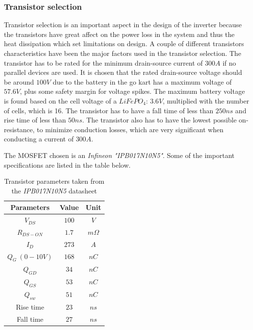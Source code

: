\subsubsection{Transistor selection}
Transistor selection is an important aspect in the design of the inverter because the transistors have great affect on the power loss in the system and thus the heat dissipation which set limitations on design. 
A couple of different transistors characteristics have been the major factors used in the transistor selection.
The transistor has to be rated for the minimum drain-source current of $300 A$ if no parallel devices are used. It is chosen that the rated drain-source voltage should be around $100 V$ due to the battery in the go kart has a maximum voltage of $57.6V$, plus some safety margin for voltage spikes. 
The maximum battery voltage is found based on the cell voltage of a $LiFePO_4$: $3.6 V$, multiplied with the number of cells, which is 16. The transistor has to have a fall time of less than $250ns$ and rise time of less than $50ns$. The transistor also has to have the lowest possible on-resistance, to minimize conduction losses, which are very significant when conducting a current of $300A$.


The MOSFET chosen is an \textit{Infineon "IPB017N10N5"}. Some of the important specifications are listed in the table below.
\begin{table} [H]
\centering
 \begin{tabular}{|c|c|c|} 
 \hline
 \textbf{Parameters} & \textbf{Value} & \textbf{Unit} \\
 \hline
 \textbf{$V_{DS}$} & $100$ & $V$ \\  
 \hline
 \textbf{$R_{DS-ON}$} & $1.7$ & $m\Omega$ \\
 \hline
 \textbf{$I_D$} & $273$ & $A$ \\
 \hline
 \textbf{$Q_G\ (0-10V)$} & $168$ & $nC$ \\
 \hline
 \textbf{$Q_{GD}$} & $34$ & $nC$ \\
 \hline
 \textbf{$Q_{GS}$} & $53$ & $nC$ \\
 \hline
 \textbf{$Q_{sw}$} & $51$ & $nC$ \\
 \hline
 Rise time & $23$ & $ns$ \\
 \hline
 Fall time & $27$ & $ns$ \\
 \hline
\end{tabular}
\caption{Transistor parameters taken from the \textit{IPB017N10N5} datasheet}
\end{table}


